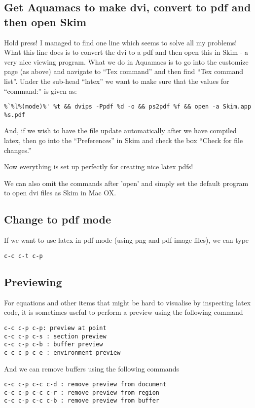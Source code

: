 \documentclass[a4paper, 10pt]{article}
\begin{document}
\subsection*{Get Aquamacs to make dvi, convert to pdf and then open Skim}
Hold press! I managed to find one line which seems to solve all my problems! What this line does is to convert the dvi to a pdf and then open this in Skim - a very nice viewing program. What we do in Aquamacs is to go into the customize page (as above) and navigate to ``Tex command'' and then find ``Tex command list''.  Under the sub-head ``latex'' we want to make sure that the values for ``command:'' is given as:
\begin{verbatim}
%`%l%(mode)%' %t && dvips -Ppdf %d -o && ps2pdf %f && open -a Skim.app %s.pdf
\end{verbatim}

And, if we wish to have the file update automatically after we have compiled latex, then go into the ``Preferences'' in Skim and check the box ``Check for file changes.''

Now everything is set up perfectly for creating nice latex pdfs!

We can also omit the commands after 'open' and simply set the default
program to open dvi files as Skim in Mac OX.

\subsection*{Change to pdf mode}
\label{sec:change-pdf-mode}

If we want to use latex in pdf mode (using png and pdf image files),
we can type
\begin{verbatim}
c-c c-t c-p
\end{verbatim}

\subsection{Previewing}
\label{sec:previewing}

For equations and other items that might be hard to visualise by
inspecting latex code, it is sometimes useful to perform a preview
using the following command
\begin{verbatim}
c-c c-p c-p: preview at point
c-c c-p c-s : section preview 
c-c c-p c-b : buffer preview
c-c c-p c-e : environment preview
\end{verbatim}

And we can remove buffers using the following commands
\begin{verbatim}
c-c c-p c-c c-d : remove preview from document
c-c c-p c-c c-r : remove preview from region
c-c c-p c-c c-b : remove preview from buffer
\end{verbatim}
\end{document}
